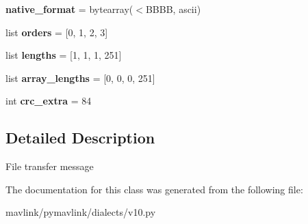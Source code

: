 \begin{DoxyCompactItemize}
\item 
\mbox{\label{classpymavlink_1_1dialects_1_1v10_1_1MAVLink__file__transfer__protocol__message_a21ae1eddad4881f414f5f9542a32d340}} 
{\bfseries native\+\_\+format} = bytearray(\textquotesingle{}$<$B\+B\+BB\textquotesingle{}, \textquotesingle{}ascii\textquotesingle{})
\item 
\mbox{\label{classpymavlink_1_1dialects_1_1v10_1_1MAVLink__file__transfer__protocol__message_ac647246977443b1ab161b096a2e2127b}} 
list {\bfseries orders} = \mbox{[}0, 1, 2, 3\mbox{]}
\item 
\mbox{\label{classpymavlink_1_1dialects_1_1v10_1_1MAVLink__file__transfer__protocol__message_a9899bb5f4d581402cfff689473b430fb}} 
list {\bfseries lengths} = \mbox{[}1, 1, 1, 251\mbox{]}
\item 
\mbox{\label{classpymavlink_1_1dialects_1_1v10_1_1MAVLink__file__transfer__protocol__message_aa9af21935f16ecb21f11996094b2621a}} 
list {\bfseries array\+\_\+lengths} = \mbox{[}0, 0, 0, 251\mbox{]}
\item 
\mbox{\label{classpymavlink_1_1dialects_1_1v10_1_1MAVLink__file__transfer__protocol__message_ac3949baef42250ff97d70c3a2571ffe7}} 
int {\bfseries crc\+\_\+extra} = 84
\end{DoxyCompactItemize}


\subsection{Detailed Description}
\begin{DoxyVerb}File transfer message
\end{DoxyVerb}
 

The documentation for this class was generated from the following file\+:\begin{DoxyCompactItemize}
\item 
mavlink/pymavlink/dialects/v10.\+py\end{DoxyCompactItemize}
